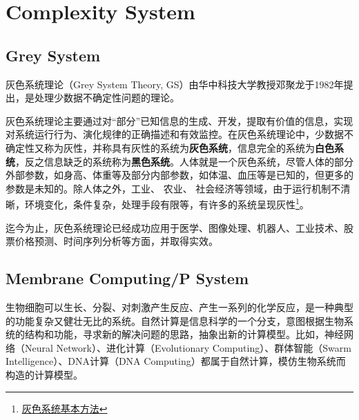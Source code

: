 \chapter{Complexity System}
\section{Grey System}
灰色系统理论（Grey System Theory, GS）\cite{deng1982control,deng1986grey,deng1987basic,deng1989introduction,deng2005primary}由华中科技大学教授邓聚龙于1982年提出，是处理少数据不确定性问题的理论。

灰色系统理论主要通过对“部分”已知信息的生成、开发，提取有价值的信息，实现对系统运行行为、演化规律的正确描述和有效监控。在灰色系统理论中，少数据不确定性又称为灰性，并称具有灰性的系统为\textbf{灰色系统}，信息完全的系统为\textbf{白色系统}，反之信息缺乏的系统称为\textbf{黑色系统}。人体就是一个灰色系统，尽管人体的部分外部参数，如身高、体重等及部分内部参数，如体温、血压等是已知的，但更多的参数是未知的。除人体之外，工业、 农业、 社会经济等领域，由于运行机制不清晰，环境变化，条件复杂，处理手段有限等，有许多的系统呈现灰性\cite{deng1987grey}\footnote{\href{http://61.133.8.10:8080/date\%5CN\%5CA2087467.pdf}{灰色系统基本方法}}。

迄今为止，灰色系统理论已经成功应用于医学、图像处理、机器人、工业技术、股票价格预测\cite{wang2002predicting}、时间序列分析\cite{kayacan2010grey}等方面，并取得实效。

\section{Membrane Computing/P System}
生物细胞可以生长、分裂、对刺激产生反应、产生一系列的化学反应，是一种典型的功能复杂又健壮无比的系统。自然计算是信息科学的一个分支，意图根据生物系统的结构和功能，寻求新的解决问题的思路，抽象出新的计算模型。比如，神经网络（Neural Network）、进化计算（Evolutionary Computing）、群体智能（Swarm Intelligence）、DNA计算（DNA Computing）都属于自然计算，模仿生物系统而构造的计算模型。

